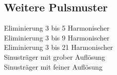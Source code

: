 \subsection{Weitere Pulsmuster}
Eliminierung 3 bis 5 Harmonischer \\
Eliminierung 3 bis 9 Harmonischer \\
Eliminierung 3 bis 21 Harmonischer \\
Sinusträger mit grober Auflösung \\
Sinusträger mit feiner Auflösung \\

\clearpage
